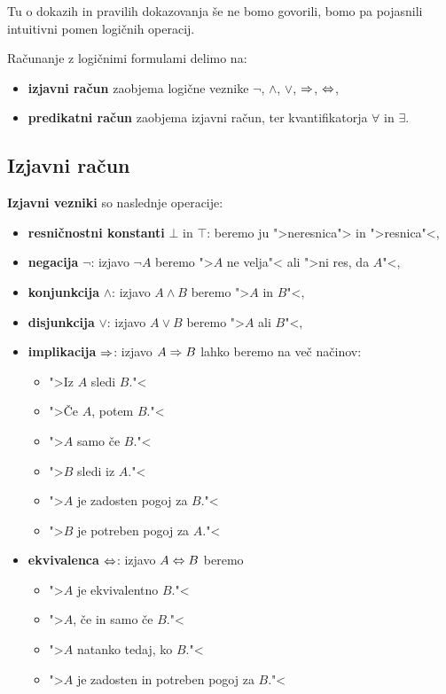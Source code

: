 Tu o dokazih in pravilih dokazovanja še ne bomo govorili, bomo pa pojasnili intuitivni pomen logičnih operacij.

Računanje z logičnimi formulami delimo na:
%
\begin{itemize}
\item \textbf{izjavni račun} zaobjema logične veznike $\neg $, $\land$, $\lor$, $\Rightarrow$, $\Leftrightarrow$,
\item \textbf{predikatni račun} zaobjema izjavni račun, ter kvantifikatorja $\forall$ in $\exists$.
\end{itemize}


\subsection{Izjavni račun}

\textbf{Izjavni vezniki} so naslednje operacije:
%
\begin{itemize}

\item \textbf{resničnostni konstanti} $\bot$ in $\top$: beremo ju ">neresnica"> in ">resnica"<,

\item \textbf{negacija} $\neg$: izjavo $\neg A$ beremo ">$A$ ne velja"< ali ">ni res, da $A$"<,

\item \textbf{konjunkcija} $\land$: izjavo $A \land B$ beremo ">$A$ in $B$"<,

\item \textbf{disjunkcija} $\lor$: izjavo $A \lor B$ beremo ">$A$ ali $B$"<,

\item \textbf{implikacija} $\Rightarrow$: izjavo $A \Rightarrow B$ lahko beremo na več načinov:
  \begin{itemize}
  \item ">Iz $A$ sledi $B$."<
  \item ">Če $A$, potem $B$."<
  \item ">$A$ samo če $B$."<
  \item ">$B$ sledi iz $A$."<
  \item ">$A$ je zadosten pogoj za $B$."<
  \item ">$B$ je potreben pogoj za $A$."<
  \end{itemize}
\item \textbf{ekvivalenca} $\Leftrightarrow$: izjavo $A \Leftrightarrow B$ beremo
  \begin{itemize}
  \item ">$A$ je ekvivalentno $B$."<
  \item ">$A$, če in samo če $B$."<
  \item ">$A$ natanko tedaj, ko $B$."<
  \item ">$A$ je zadosten in potreben pogoj za $B$."<
  \end{itemize}
\end{itemize}
